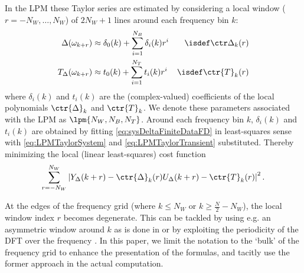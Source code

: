 In the \gls{LPM} these Taylor series are estimated by considering a local window ($r = -N_{W}, \ldots, N_{W}$) of $2N_{W} + 1$ lines around each frequency bin $k$:
\begin{align}
  \Delta(\omega_{k+r})     &\approx \delta_{0}(k) + \sum_{i=1}^{N_{B}} \delta_{i}(k) r^{i} &\isdef \ctr\Delta_{k}(r)\label{eq:LPMTaylorSystem} \\
  T_{\Delta}(\omega_{k+r}) &\approx t_{0}(k)      + \sum_{i=1}^{N_{T}} t_{i}(k)      r^{i} &\isdef \ctr{T}_{k}(r)\label{eq:LPMTaylorTransient}
\end{align}
where $\delta_{i}(k)$ and $t_{i}(k)$ are the (complex-valued) coefficients of the local polynomials $\ctr{\Delta}_{k}$ and $\ctr{T}_{k}$.
We denote these parameters associated with the \gls{LPM} as $\lpm{N_W,N_B,N_T}$.
Around each frequency bin $k$, $\delta_{i}(k)$ and $t_{i}(k)$ are obtained by fitting \eqref{eq:sysDeltaFiniteDataFD}  in least-squares sense with \eqref{eq:LPMTaylorSystem} and \eqref{eq:LPMTaylorTransient} substituted.
Thereby minimizing the local (linear least-squares) cost function 
\begin{equation}
  \sum_{r=-N_W}^{N_W} \left| Y_{\Delta}(k+r) - \ctr{\Delta}_{k}(r) U_{\Delta}(k+r) - \ctr{T}_{k}(r) \right|^2 \text{.}
  \label{eq:costLxM}
\end{equation}

At the edges  of the frequency grid (where $k \leq N_{W}$ or $k \geq \frac{N}{2} - N_{W}$), the local window index $r$ becomes degenerate.
This can be tackled by using e.g. an asymmetric window around $k$ as is done in \citep{Pintelon2010LPM1} or by exploiting the periodicity of the \gls{DFT} over the frequency \citep{McKelvey2012LRM}.
In this paper, we limit the notation to the `bulk' of the frequency grid to enhance the presentation of the formulas, and tacitly use the former approach in the actual computation.

